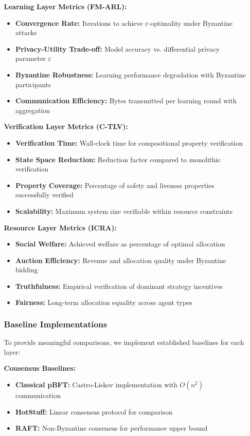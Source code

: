 \documentclass[conference]{IEEEtran}
\newcommand{\epsilon}{\varepsilon}
\begin{document}
\textbf{Learning Layer Metrics (FM-ARL):}
\begin{itemize}
    \item \textbf{Convergence Rate:} Iterations to achieve $\epsilon$-optimality under Byzantine attacks
    \item \textbf{Privacy-Utility Trade-off:} Model accuracy vs. differential privacy parameter $\epsilon$
    \item \textbf{Byzantine Robustness:} Learning performance degradation with Byzantine participants
    \item \textbf{Communication Efficiency:} Bytes transmitted per learning round with aggregation
\end{itemize}

\textbf{Verification Layer Metrics (C-TLV):}
\begin{itemize}
    \item \textbf{Verification Time:} Wall-clock time for compositional property verification
    \item \textbf{State Space Reduction:} Reduction factor compared to monolithic verification
    \item \textbf{Property Coverage:} Percentage of safety and liveness properties successfully verified
    \item \textbf{Scalability:} Maximum system size verifiable within resource constraints
\end{itemize}

\textbf{Resource Layer Metrics (ICRA):}
\begin{itemize}
    \item \textbf{Social Welfare:} Achieved welfare as percentage of optimal allocation
    \item \textbf{Auction Efficiency:} Revenue and allocation quality under Byzantine bidding
    \item \textbf{Truthfulness:} Empirical verification of dominant strategy incentives
    \item \textbf{Fairness:} Long-term allocation equality across agent types
\end{itemize}

\subsubsection{Baseline Implementations}

To provide meaningful comparisons, we implement established baselines for each layer:

\textbf{Consensus Baselines:}
\begin{itemize}
    \item \textbf{Classical pBFT:} Castro-Liskov implementation with $O(n^2)$ communication
    \item \textbf{HotStuff:} Linear consensus protocol for comparison
    \item \textbf{RAFT:} Non-Byzantine consensus for performance upper bound
\end{itemize}
\end{document}
